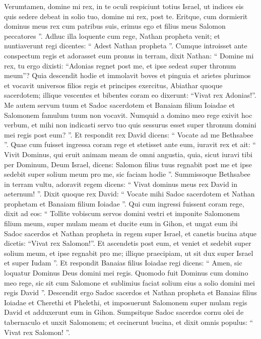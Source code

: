 \begin{biblechapter}
\verse Verumtamen, domine mi rex, in te oculi respiciunt totius Israel, ut indices eis quis sedere debeat in solio tuo, domine mi rex, post te. 
\verse Eritque, cum dormierit dominus meus rex cum patribus suis, erimus ego et filius meus Salomon peccatores ”.
 \verse Adhuc illa loquente cum rege, Nathan propheta venit; 
\verse et nuntiaverunt regi dicentes: “ Adest Nathan propheta ”. Cumque introisset ante conspectum regis et adorasset eum pronus in terram, 
\verse dixit Nathan: “ Domine mi rex, tu ergo dixisti: “Adonias regnet post me, et ipse sedeat super thronum meum”? 
 \verse Quia descendit hodie et immolavit boves et pinguia et arietes plurimos et vocavit universos filios regis et principes exercitus, Abiathar quoque sacerdotem; illique vescentes et bibentes coram eo dixerunt: “Vivat rex Adonias!”. 
\verse Me autem servum tuum et Sadoc sacerdotem et Banaiam filium Ioiadae et Salomonem famulum tuum non vocavit. 
\verse Numquid a domino meo rege exivit hoc verbum, et mihi non indicasti servo tuo quis sessurus esset super thronum domini mei regis post eum? ”.
 \verse Et respondit rex David dicens: “ Vocate ad me Bethsabee ”. Quae cum fuisset ingressa coram rege et stetisset ante eum, 
\verse iuravit rex et ait: “ Vivit Dominus, qui eruit animam meam de omni angustia, 
\verse quia, sicut iuravi tibi per Dominum, Deum Israel, dicens: Salomon filius tuus regnabit post me et ipse sedebit super solium meum pro me, sic faciam hodie ”. 
\verse Summissoque Bethsabee in terram vultu, adoravit regem dicens: “ Vivat dominus meus rex David in aeternum! ”.
 \verse Dixit quoque rex David: “ Vocate mihi Sadoc sacerdotem et Nathan prophetam et Banaiam filium Ioiadae ”. Qui cum ingressi fuissent coram rege, 
\verse dixit ad eos: “ Tollite vobiscum servos domini vestri et imponite Salomonem filium meum, super mulam meam et ducite eum in Gihon, 
\verse et ungat eum ibi Sadoc sacerdos et Nathan propheta in regem super Israel, et canetis bucina atque dicetis: “Vivat rex Salomon!”. 
\verse Et ascendetis post eum, et veniet et sedebit super solium meum, et ipse regnabit pro me; illique praecipiam, ut sit dux super Israel et super Iudam ”. 
\verse Et respondit Banaias filius Ioiadae regi dicens: “ Amen, sic loquatur Dominus Deus domini mei regis. 
\verse Quomodo fuit Dominus cum domino meo rege, sic sit cum Salomone et sublimius faciat solium eius a solio domini mei regis David ”.
 \verse Descendit ergo Sadoc sacerdos et Nathan propheta et Banaias filius Ioiadae et Cherethi et Phelethi, et imposuerunt Salomonem super mulam regis David et adduxerunt eum in Gihon. 
\verse Sumpsitque Sadoc sacerdos cornu olei de tabernaculo et unxit Salomonem; et cecinerunt bucina, et dixit omnis populus: “ Vivat rex Salomon! ”. 

\end{biblechapter}
